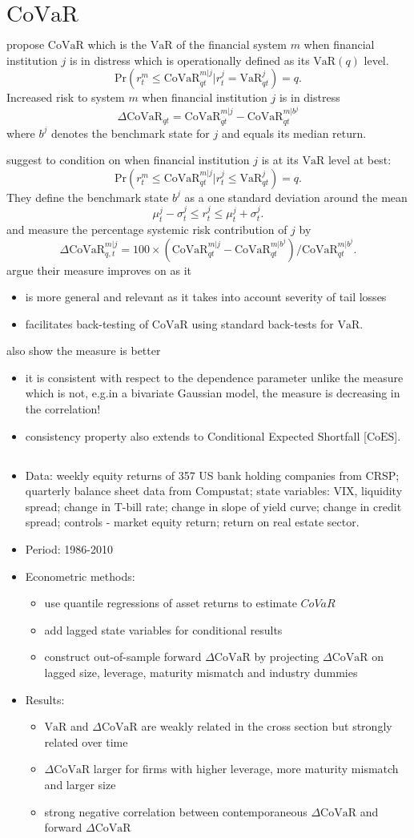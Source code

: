 \documentclass[authoryear]{elsarticle}
\newcommand{\bi}{\begin{itemize}}
\newcommand{\ei}{\end{itemize}}
\renewcommand{\i}{\item}
\newcommand{\var}{\ensuremath{\mathrm{VaR}}}
\newcommand{\covar}{\ensuremath{\mathrm{CoVaR}}}
\newcommand{\coes}{\ensuremath{\mathrm{CoES}}}
\begin{document}
\section{$\covar$}

\cite{adrian2011} propose $\covar$ which is the $\var$ of the financial system $m$ when financial institution $j$ is in distress which is operationally defined as its $\var(q)$ level. 
$$\text{Pr}(r_t^m\leq\covar_{qt}^{m|j}|r_t^j=\var_{qt}^j)=q.$$
Increased risk to system $m$ when financial institution $j$ is in distress 
$$\Delta \covar_{qt}=\covar_{qt}^{m|j}-\covar_{qt}^{m|b^j}$$ 
where $b^j$ denotes the benchmark state for $j$ and equals its median return.

\cite{Girardi2013} suggest to condition on when financial institution $j$ is at its $\var$ level at best:
$$\text{Pr}(r_t^m\leq \covar_{qt}^{m|j}|r_t^j\leq \var_{qt}^j)=q.$$ They define the benchmark state $b^j$ as a one standard deviation around the mean
$$\mu_t^j - \sigma_t^j \leq r_t^j \leq \mu_t^j + \sigma_t^j.$$
and measure the percentage systemic risk contribution of $j$ by
$$\Delta \covar_{q,t}^{m|j}=100\times (\covar_{qt}^{m|j}-\covar_{qt}^{m|b^j})/\covar_{qt}^{m|b^j}.$$  \cite{Girardi2013} argue their measure improves on \cite{adrian2011} as it
\bi
\i is more general and relevant as it takes into account severity of tail losses
\i facilitates back-testing of $\covar$ using standard back-tests for $\var$.
\ei
\cite{Mainik2012} also show the \cite{Girardi2013} measure is better 
\bi
\i it is consistent with respect to the dependence parameter unlike the \cite{adrian2011} measure which is not, e.g.in a bivariate Gaussian model, the \cite{adrian2011} measure is decreasing in the correlation! 
\i consistency property also extends to Conditional Expected Shortfall [$\coes$]. 
\ei 


\subsection{\cite{adrian2011}}
\bi
\i Data: weekly equity returns of 357 US bank holding companies from CRSP; quarterly balance sheet data from Compustat; state variables: VIX, liquidity spread; change in T-bill rate; change in slope of yield curve; change in credit spread; controls - market equity return; return on real estate sector.
\i Period:  1986-2010
\i Econometric methods:  
\bi
\i use quantile regressions of asset returns to estimate $CoVaR$ 
\i add lagged state variables for conditional results
\i construct out-of-sample forward $\Delta \covar$ by projecting $\Delta \covar$ on lagged size, leverage, maturity mismatch and industry dummies
\ei
\i Results:
\bi
\i $\var$ and $\Delta \covar$ are weakly related in the cross section but strongly related over time
\i $\Delta \covar$ larger for firms with higher leverage, more maturity mismatch and larger size
\i strong negative correlation between contemporaneous $\Delta \covar$ and forward $\Delta \covar$
\ei
\ei 
\end{document}
